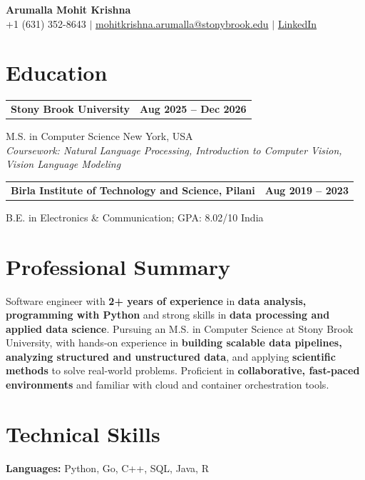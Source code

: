 \documentclass[letterpaper,10pt]{article}
\makeatletter
\newcommand{\entry}[2]{%
  \noindent
  \begin{tabularx}{\linewidth}
    {@{}>{\raggedright\arraybackslash}X@{\hspace{6pt}}r@{}}
    \textbf{#1} & #2
  \end{tabularx}\par
}
\makeatother
\begin{document}
\begin{center}
    {\LARGE\bfseries Arumalla Mohit Krishna}\\[3pt]
    +1 (631) 352-8643 $|$
    \href{mailto:mohitkrishna.arumalla@stonybrook.edu}
    {mohitkrishna.arumalla@stonybrook.edu} $|$
    \href{https://linkedin.com/in/mohit-krishna-arumalla}
    {LinkedIn}
\end{center}
\vspace{-8pt}

\section{Education}

\entry
  {\textbf{Stony Brook University}}
  {\textbf{Aug 2025 -- Dec 2026}}

M.S. in Computer Science \hfill New York, USA\\
\textit{
Coursework: Natural Language Processing,
Introduction to Computer Vision, Vision Language Modeling
}
\vspace{3pt}

\entry
  {\textbf{Birla Institute of Technology and Science, Pilani}}
  {\textbf{Aug 2019 -- 2023}}

B.E. in Electronics \& Communication; GPA: 8.02/10 \hfill India

\section{Professional Summary}

Software engineer with \textbf{2+ years of experience} in \textbf{data analysis, programming with Python} and strong skills in \textbf{data processing and applied data science}. Pursuing an M.S. in Computer Science at Stony Brook University, with hands-on experience in \textbf{building scalable data pipelines, analyzing structured and unstructured data}, and applying \textbf{scientific methods} to solve real-world problems. Proficient in \textbf{collaborative, fast-paced environments} and familiar with cloud and container orchestration tools.

\section{Technical Skills}

\textbf{Languages:}
Python, Go, C++, SQL, Java, R\\
\end{document}
